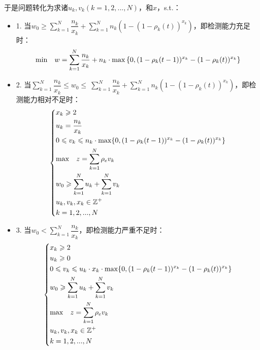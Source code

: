 \documentclass[withoutpreface,bwprint]{cumcmthesis} %
\begin{document}
于是问题转化为求诸$u_k,v_k(k=1,2,...,N)$，和$x$，s.t.：
\begin{itemize}
    \item{1.}
    当$w_0 \geqslant \sum\limits^N_{k=1}\dfrac{n_k}{x_k} + \sum\limits^N_{k=1}n_k  (1-(1-\rho_k(t))^{x_k})$，即检测能力充足时：
\begin{align}
\label{naive}
    {\rm min} \quad w= \sum^N_{k=1} \frac{n_k}{x_k}+ n_k\cdot {\rm max} \left\{0,(1-\rho_k(t-1))^{x_k}-(1-\rho_k(t))^{x_k}\right\}
\end{align}
    
    \item{2.}
        当$\sum\limits^N_{k=1}\dfrac{n_k}{x_k} \leqslant w_0 \leqslant\ \sum\limits^N_{k=1}\dfrac{n_k}{x_k} + \sum\limits^N_{k=1}n_k  (1-(1-\rho_k(t))^{x_k})$，即检测能力相对不足时：
\begin{align}
\label{eq2}
    \left\{
    \begin{aligned}
        &x_k \geqslant 2 \\
        &u_k =\frac{n_k}{x_k} \\
        &0 \leqslant v_k \leqslant  n_k \cdot {\rm max}
         \{0,(1-\rho_k(t-1))^{x_k}-(1-\rho_k(t))^{x_k} \} \\
        &{\rm max} \quad z = \sum^N_{k=1}\rho_e v_k  \\
        &w_0 \geqslant \sum^N_{k=1} u_k +\sum^N_{k=1} v_k  \\
        &u_k,v_k,x_k\in\mathbb{Z^+}\\
        &k=1,2,...,N \\
    \end{aligned}
    \right.
\end{align}

    \item{3.}
当$w_0 < \sum\limits^N_{k=1}\dfrac{n_k}{x_k}$，即检测能力严重不足时：
\begin{align}
\label{eq3}
    \left\{
    \begin{aligned}
        &x_k \geqslant 2  \\
        &u_k \geqslant 0  \\
        &0\leqslant v_k \leqslant u_k \cdot x_k \cdot {\rm max} \{0,(1-\rho_k(t-1))^{x_k}-(1-\rho_k(t))^{x_k} \} \\
        &w_0 \geqslant \sum^N_{k=1} u_k +\sum^N_{k=1} v_k  \\
        &{\rm max} \quad z = \sum^N_{k=1}\rho_{e} v_k  \\
        &u_k,v_k,x_k\in\mathbb{Z^+}\\
        &k=1,2,...,N \\
    \end{aligned}
    \right.
\end{align}
    


\end{itemize}
\end{document}
